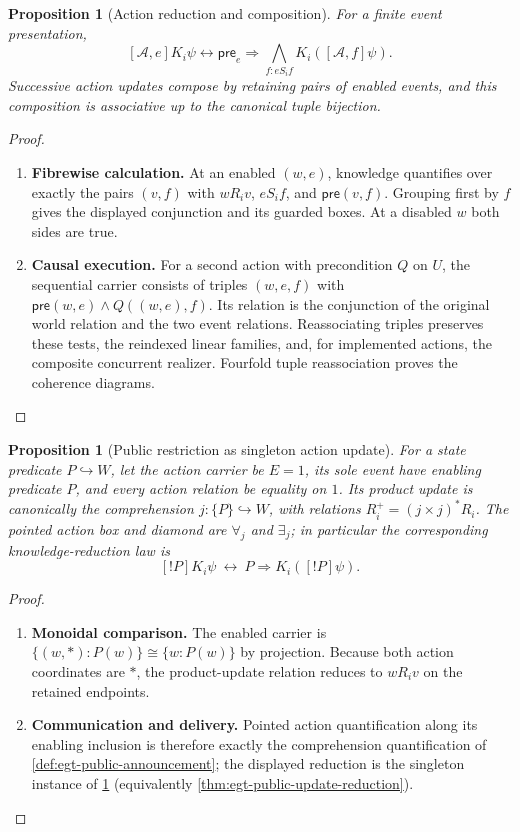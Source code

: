 \documentclass[11pt,a4paper]{article}
\numberwithin{equation}{section}
\newtheorem{proposition}[theorem]{Proposition}
\theoremstyle{definition}
\theoremstyle{remark}
\theoremstyle{plain}
\begin{document}
\begin{proposition}[Action reduction and composition]
\label{agt-prop-action}
For a finite event presentation,
\[
 [\mathcal A,e]K_i\psi
 \leftrightarrow
 \mathsf{pre}_e\Rightarrow
 \bigwedge_{f:eS_if}K_i([\mathcal A,f]\psi).
\]
Successive action updates compose by retaining pairs of enabled events,
and this composition is associative up to the canonical tuple bijection.
\end{proposition}
\begin{proof}
\leavevmode
\begin{enumerate}[label=\textup{(\arabic*)},leftmargin=*,itemsep=4pt,topsep=3pt]
  \item \textbf{Fibrewise calculation.} At an enabled $(w,e)$, knowledge quantifies over exactly the pairs $(v,f)$
with $wR_iv$, $eS_if$, and $\mathsf{pre}(v,f)$. Grouping first by $f$
gives the displayed conjunction and its guarded boxes. At a disabled $w$
both sides are true.
  \item \textbf{Causal execution.} For a second action with precondition $Q$ on $U$,
the sequential carrier consists of triples $(w,e,f)$ with
$\mathsf{pre}(w,e)\wedge Q((w,e),f)$. Its relation is the conjunction
of the original world relation and the two event relations. Reassociating
triples preserves these tests, the reindexed linear families, and, for
implemented actions, the composite concurrent realizer. Fourfold tuple
reassociation proves the coherence diagrams.
\end{enumerate}
\end{proof}

\begin{proposition}[Public restriction as singleton action update]
\label{prop:public-singleton-action}
For a state predicate $P\hookrightarrow W$, let the action carrier be
$E=1$, its sole event have enabling predicate $P$, and every action
relation be equality on $1$. Its product update is canonically the
comprehension $j:\{P\}\hookrightarrow W$, with relations
$R_i^+= (j\times j)^*R_i$. The pointed action box and diamond are
$\forall_j$ and $\exists_j$; in particular the corresponding
knowledge-reduction law is
\[
 [!P]K_i\psi\ \longleftrightarrow\
 P\Rightarrow K_i([!P]\psi).
\]
\end{proposition}
\begin{proof}
\leavevmode
\begin{enumerate}[label=\textup{(\arabic*)},leftmargin=*,itemsep=4pt,topsep=3pt]
  \item \textbf{Monoidal comparison.} The enabled carrier is
$\{(w,*):P(w)\}\cong\{w:P(w)\}$ by projection. Because both action coordinates are $*$, the product-update relation
reduces to $wR_iv$ on the retained endpoints.
  \item \textbf{Communication and delivery.} Pointed action
quantification along its enabling inclusion is therefore exactly the
comprehension quantification of
\cref{def:egt-public-announcement}; the displayed reduction is the
singleton instance of \cref{agt-prop-action} (equivalently
\cref{thm:egt-public-update-reduction}).
\end{enumerate}
\end{proof}
\end{document}
